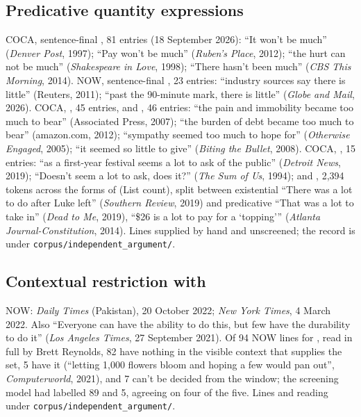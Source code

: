 \documentclass[12pt]{article}
\begin{document}
\subsection{Predicative quantity expressions}

COCA, sentence-final , 81 entries (18 September 2026): \enquote{It won't be much} (\textit{Denver Post}, 1997); \enquote{Pay won't be much} (\textit{Ruben's Place}, 2012); \enquote{the hurt can not be much} (\textit{Shakespeare in Love}, 1998); \enquote{There hasn't been much} (\textit{CBS This Morning}, 2014). NOW, sentence-final , 23 entries: \enquote{industry sources say there is little} (Reuters, 2011); \enquote{past the 90-minute mark, there is little} (\textit{Globe and Mail}, 2026). COCA, , 45 entries, and , 46 entries: \enquote{the pain and immobility became too much to bear} (Associated Press, 2007); \enquote{the burden of debt became too much to bear} (amazon.com, 2012); \enquote{sympathy seemed too much to hope for} (\textit{Otherwise Engaged}, 2005); \enquote{it seemed so little to give} (\textit{Biting the Bullet}, 2008). COCA, , 15 entries: \enquote{as a first-year festival seems a lot to ask of the public} (\textit{Detroit News}, 2019); \enquote{Doesn't seem a lot to ask, does it?} (\textit{The Sum of Us}, 1994); and , 2,394 tokens across the forms of  (List count), split between existential \enquote{There was a lot to do after Luke left} (\textit{Southern Review}, 2019) and predicative \enquote{That was a lot to take in} (\textit{Dead to Me}, 2019), \enquote{\$26 is a lot to pay for a \enquote{topping}} (\textit{Atlanta Journal-Constitution}, 2014). Lines supplied by hand and unscreened; the record is under \texttt{corpus/independent\_argument/}.

\subsection{Contextual restriction with }

NOW: \textit{Daily Times} (Pakistan), 20 October 2022; \textit{New York Times}, 4 March 2022. Also \enquote{Everyone can have the ability to do this, but few have the durability to do it} (\textit{Los Angeles Times}, 27 September 2021). Of 94 NOW lines for , read in full by Brett Reynolds, 82 have nothing in the visible context that supplies the set, 5 have it (\enquote{letting 1,000 flowers bloom and hoping a few would pan out}, \textit{Computerworld}, 2021), and 7 can't be decided from the window; the screening model had labelled 89 and 5, agreeing on four of the five. Lines and reading under \texttt{corpus/independent\_argument/}.
\end{document}
